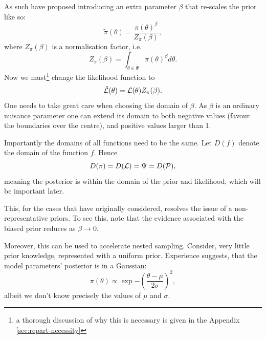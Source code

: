 \documentclass[usenatbib]{mnras}
\begin{document}
As such \citeauthor{chen-ferroz-hobson} have proposed introducing an
extra parameter \(\beta\) that re-scales the prior like so:
\begin{equation}
  \tilde{\pi}(\theta) = \frac{\pi(\theta)^{\beta}}{Z_{\pi}(\beta)},
\end{equation}
where \(Z_\pi(\beta)\) is a normalisation factor, i.e. 
\begin{equation}
  Z_{\pi}(\beta) = \int_{\theta \in \Psi} \pi(\theta)^{\beta}d\theta.
\end{equation}
Now we must\footnote{a thorough discussion of why this is necessary is given in the Appendix \autoref{sec:repart-necessity}} change the likelihood function to 
\begin{equation}
  \tilde{\cal L}(\theta) = {\cal L}(\theta) Z_{\pi}(\beta).
\end{equation}
One needs to take great care when choosing the domain of
\(\beta\). As \(\beta\) is an ordinary nuisance parameter one can
extend its domain to both negative values (favour the boundaries
over the centre), and positive values larger than 1.

Importantly the domains of all functions need to be the same. Let
\(D(f)\) denote the domain of the function \(f\). Hence
\begin{equation}
  D(\pi) = D({\cal L}) = \Psi = D({\cal P}),
\end{equation} 
meaning the posterior is within the domain of the prior and
likelihood, which will be important later.\label{domain-discussion}

This, for the cases that \citeauthor{chen-ferroz-hobson} have
originally considered, resolves the issue of a non-representative
priors. To see this, note that the evidence associated with the
biased prior reduces as \(\beta\rightarrow0\).

Moreover, this can be used to accelerate nested sampling.
Consider, very little prior knowledge, represented with a uniform
prior. Experience suggests, that the model parameters' posterior
is in  a Gaussian:
\begin{equation}
 \pi (\theta) \propto \exp{ -\left(\frac{\theta - \mu}{2\sigma}\right)^{2}},
\end{equation}
albeit we don't know precisely the values of \(\mu\) and
\(\sigma\). 
\end{document}
